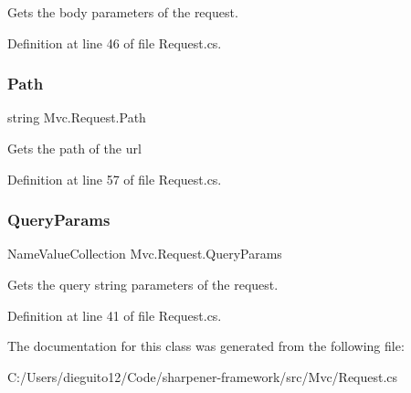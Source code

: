 Gets the body parameters of the request. 



Definition at line 46 of file Request.\+cs.

\mbox{\label{class_mvc_1_1_request_ab12e18ae01b18842ea97d8dc5ea8b9f9}} 
\subsubsection{\texorpdfstring{Path}{Path}}
{\footnotesize\ttfamily string Mvc.\+Request.\+Path\hspace{0.3cm}{\ttfamily [get]}}



Gets the path of the url 



Definition at line 57 of file Request.\+cs.

\mbox{\label{class_mvc_1_1_request_a5ed7768ef9fa97d550a09186e1272f5b}} 
\subsubsection{\texorpdfstring{Query\+Params}{QueryParams}}
{\footnotesize\ttfamily Name\+Value\+Collection Mvc.\+Request.\+Query\+Params\hspace{0.3cm}{\ttfamily [get]}}



Gets the query string parameters of the request. 



Definition at line 41 of file Request.\+cs.



The documentation for this class was generated from the following file\+:\begin{DoxyCompactItemize}
\item 
C\+:/\+Users/dieguito12/\+Code/sharpener-\/framework/src/\+Mvc/Request.\+cs\end{DoxyCompactItemize}
